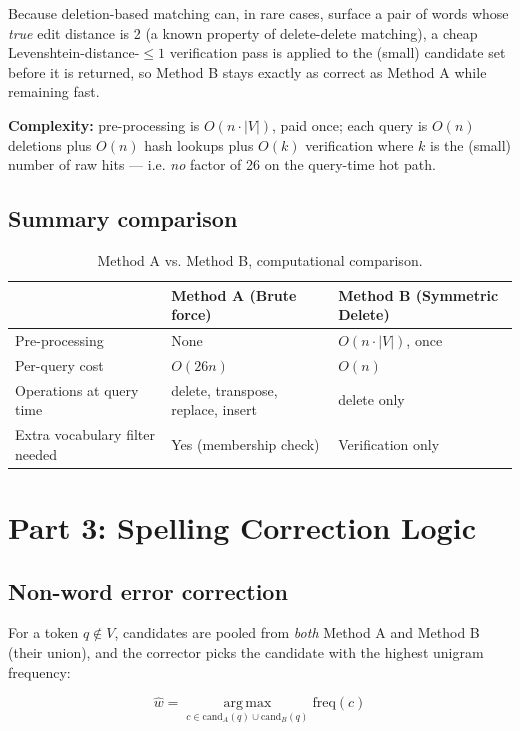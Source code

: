 \documentclass[11pt]{article}
\begin{document}
Because deletion-based matching can, in rare cases, surface a pair of words whose \textit{true} edit distance is 2 (a known property of delete-delete matching), a cheap Levenshtein-distance-$\leq 1$ verification pass is applied to the (small) candidate set before it is returned, so Method B stays exactly as correct as Method A while remaining fast.

\textbf{Complexity:} pre-processing is $O(n \cdot |V|)$, paid once; each query is $O(n)$ deletions plus $O(n)$ hash lookups plus $O(k)$ verification where $k$ is the (small) number of raw hits --- i.e. \textit{no} factor of 26 on the query-time hot path.

\subsection{Summary comparison}

\begin{table}[H]
\centering
\small
\begin{tabular}{lll}
\toprule
 & \textbf{Method A (Brute force)} & \textbf{Method B (Symmetric Delete)} \\
\midrule
Pre-processing & None & $O(n \cdot |V|)$, once \\
Per-query cost & $O(26n)$ & $O(n)$ \\
Operations at query time & delete, transpose, replace, insert & delete only \\
Extra vocabulary filter needed & Yes (membership check) & Verification only \\
\bottomrule
\end{tabular}
\caption{Method A vs. Method B, computational comparison.}
\label{tab:method-comparison}
\end{table}

\section{Part 3: Spelling Correction Logic}

\subsection{Non-word error correction}

For a token $q \notin V$, candidates are pooled from \textit{both} Method A and Method B (their union), and the corrector picks the candidate with the highest unigram frequency:

\[
\hat{w} = \operatorname*{arg\,max}_{c \in \text{cand}_A(q) \cup \text{cand}_B(q)} \mathrm{freq}(c)
\]
\end{document}

